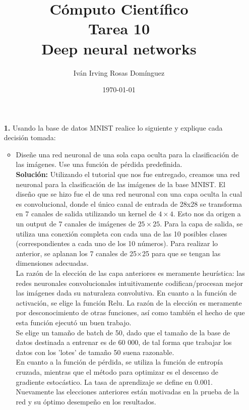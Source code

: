 \documentclass[letterpaper]{article}
\title{\textbf{Cómputo Científico\\
Tarea 10\\
Deep neural networks}}
\author{Iván Irving Rosas Domínguez}
\date{\today}
\newcommand{\1}{\mathds{1}}
\theoremstyle{definition}
\theoremstyle{definition}
\theoremstyle{definition}
\theoremstyle{definition}
\theoremstyle{definition}
\begin{document}
\maketitle


\begin{itemize}
    \item[\textbf{1.}] Usando la base de datos MNIST realice lo siguiente y explique cada decisión tomada:
    \begin{itemize}
        \item Diseñe una red neuronal de una sola capa oculta para la clasificación de las imágenes. Use una función de 
        pérdida predefinida.\\

        \textbf{Solución:} Utilizando el tutorial que nos fue entregado, creamos una red neuronal para la clasificación de las imágenes 
        de la base MNIST. El diseño que se hizo fue el de una red neuronal con una capa oculta la cual es convolucional, donde el 
        único canal de entrada de 28x28 se transforma en 7 canales de salida utilizando un kernel de $4\times4$. Esto nos da origen a 
        un output de 7 canales de imágenes de $25\times25$. Para la capa de salida, se utiliza una conexión completa con 
        cada una de las 10 posibles clases (correspondientes a cada uno de los 10 números). Para realizar lo anterior, se aplanan los 7 canales de 25$\times$25 para que se tengan las 
        dimensiones adecuadas.\\

        La razón de la elección de las capa anteriores es meramente heurística: las redes neuronales convolucionales intuitivamente
        codifican/procesan mejor las imágenes dada su naturaleza convolutiva.
        En cuanto a la función de activación, se elige la función Relu. La razón de la elección es meramente por desconocimiento de otras funciones, 
        así como también el hecho de que esta función ejecutó un buen trabajo.\\
        
        Se elige un tamaño de batch de 50, dado que el tamaño de la base de datos 
        destinada a entrenar es de 60 000, de tal forma que trabajar los datos con los 'lotes' 
        de tamaño 50 suena razonable.\\

        En cuanto a la función de pérdida, se utiliza la función de entropía cruzada, mientras 
        que el método para optimizar es el descenso de gradiente estocástico. La tasa de aprendizaje se define en 0.001. 
        Nuevamente las elecciones anteriores están motivadas en la prueba de la red y su óptimo desempeño en los resultados.\\


\end{itemize}
\end{itemize}
\end{document}
